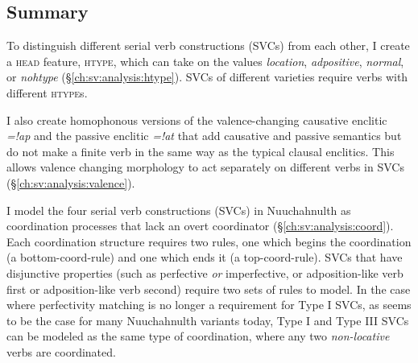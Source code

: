 \subsection{Summary}

To distinguish different serial verb constructions (SVCs) from each other, I create a \textsc{head} feature, \textsc{htype}, which can take on the values \textit{location}, \textit{adpositive}, \textit{normal}, or \textit{nohtype} (\S\ref{ch:sv:analysis:htype}). SVCs of different varieties require verbs with different \textsc{htype}s.

I also create homophonous versions of the valence-changing causative enclitic \textit{=!ap} and the passive enclitic \textit{=!at} that add causative and passive semantics but do not make a finite verb in the same way as the typical clausal enclitics. This allows valence changing morphology to act separately on different verbs in SVCs (\S\ref{ch:sv:analysis:valence}).

I model the four serial verb constructions (SVCs) in Nuuchahnulth as coordination processes that lack an overt coordinator (\S\ref{ch:sv:analysis:coord}). Each coordination structure requires two rules, one which begins the coordination (a bottom-coord-rule) and one which ends it (a top-coord-rule). SVCs that have disjunctive properties (such as perfective \textit{or} imperfective, or adposition-like verb first or adposition-like verb second) require two sets of rules to model. In the case where perfectivity matching is no longer a requirement for Type I SVCs, as seems to be the case for many Nuuchahnulth variants today, Type I and Type III SVCs can be modeled as the same type of coordination, where any two \textit{non-locative} verbs are coordinated.